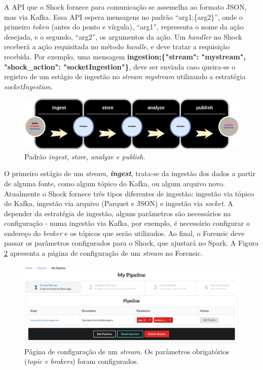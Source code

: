 A API que o Shock fornece para comunicação se assemelha ao formato JSON, mas
via Kafka. Essa API espera mensagens no padrão ``arg1;\{arg2\}'',
onde o primeiro \textit{token} (antes do ponto e vírgula), ``arg1'', representa o nome
da ação desejada, e o segundo, ``arg2'', os argumentos da ação. Um
\textit{handler} no Shock receberá a ação requisitada no método
\textit{handle}, e deve tratar a requisição recebida. Por exemplo, uma mensagem
\small{\textbf{ingestion;\{"stream": "mystream", "shock\_action": "socketIngestion"\}}},
deve ser enviada caso queira-se o registro de um estágio de ingestão no
\textit{stream} \textit{mystream} utilizando a estratégia \textit{socketIngestion}.

\begin{figure}
  \centering
  \includegraphics[width=\textwidth]{figuras/arquiteturaforensic.png}
  \caption{Padrão \textit{ingest, store, analyze e publish.}}
  \label{fig:ingeststore}
\end{figure}

O primeiro estágio de um \textit{stream}, \textit{\textbf{ingest}}, trata-se da
ingestão dos dados a partir de alguma fonte, como algum tópico do Kafka, ou
algum arquivo novo. Atualmente o Shock fornece três tipos diferentes de
ingestão: ingestão via tópico do Kafka, ingestão via arquivo (Parquet e JSON)
e ingestão via \textit{socket}. A depender da estratégia de ingestão, alguns
parâmetros são necessários na configuração - numa ingestão via Kafka, por
exemplo, é necessário configurar o endereço do
\textit{broker} e os tópicos que serão utilizados. Ao final, o Forensic deve
passar os parâmetros configurados para o Shock, que ajustará no Spark.
A Figura \ref{fig:forensicparams}
apresenta a página de configuração de um \textit{stream} no Forensic.



\begin{figure}
  \centering
  \includegraphics[width=\textwidth]{figuras/pipeline.png}
    \caption{Página de configuração de um \textit{stream}. Os parâmetros
obrigatórios (\textit{topic e brokers}) foram configurados.}
  \label{fig:forensicparams}
\end{figure}

